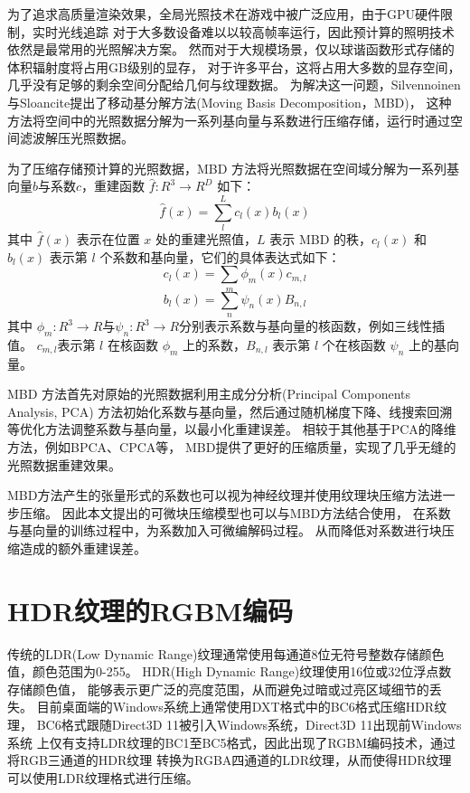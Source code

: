 为了追求高质量渲染效果，全局光照技术在游戏中被广泛应用，由于GPU硬件限制，实时光线追踪
对于大多数设备难以以较高帧率运行，因此预计算的照明技术依然是最常用的光照解决方案。
然而对于大规模场景，仅以球谐函数形式存储的体积辐射度将占用GB级别的显存\cite{silvennoinen2021moving}，
对于许多平台，这将占用大多数的显存空间，几乎没有足够的剩余空间分配给几何与纹理数据。
为解决这一问题，Silvennoinen与Sloancite\cite{silvennoinen2021moving}提出了移动基分解方法(Moving Basis Decomposition，MBD)，
这种方法将空间中的光照数据分解为一系列基向量与系数进行压缩存储，运行时通过空间滤波解压光照数据。

为了压缩存储预计算的光照数据，MBD 方法将光照数据在空间域分解为一系列基向量$b$与系数$c$，重建函数 $\hat{f}:R^3\to R^D$ 如下：
\begin{equation}
\hat f(x)=\sum_{l}^L c_{l} (x)b_{l}(x)
\end{equation}
其中 $\hat{f}(x)$ 表示在位置 $x$ 处的重建光照值，$L$ 表示 MBD 的秩，$c_l(x)$ 和 $b_l(x)$ 表示第 $l$ 个系数和基向量，它们的具体表达式如下：
\begin{equation}
c_{l}(x)=\sum_{m}\phi_{m} (x)c_{m,l}
\end{equation}
\begin{equation}
b_{l}(x)=\sum_{n}\psi_{n} (x)B_{n,l}
\end{equation}
其中 $\phi_{m}: R^{3} \rightarrow R$与$\psi_{n}: R^{3} \rightarrow R$分别表示系数与基向量的核函数，例如三线性插值。 
$c_{m,l}$表示第 $l$ 在核函数 $\phi_m$ 上的系数，$B_{n,l}$ 表示第 $l$ 个在核函数 $\psi_n$ 上的基向量。

MBD\cite{silvennoinen2021moving} 方法首先对原始的光照数据利用主成分分析(Principal Components Analysis, PCA)
方法初始化系数与基向量，然后通过随机梯度下降、线搜索回溯等优化方法调整系数与基向量，以最小化重建误差。
相较于其他基于PCA的降维方法，例如BPCA\cite{nishino2005clustered}、CPCA\cite{sloan2003clustered}等，
MBD提供了更好的压缩质量，实现了几乎无缝的光照数据重建效果。

MBD方法产生的张量形式的系数也可以视为神经纹理并使用纹理块压缩方法进一步压缩。
因此本文提出的可微块压缩模型也可以与MBD方法结合使用，
在系数与基向量的训练过程中，为系数加入可微编解码过程。
从而降低对系数进行块压缩造成的额外重建误差。

\section{HDR纹理的RGBM编码}

传统的LDR(Low Dynamic Range)纹理通常使用每通道8位无符号整数存储颜色值，颜色范围为0-255。
HDR(High Dynamic Range)纹理使用16位或32位浮点数存储颜色值，
能够表示更广泛的亮度范围，从而避免过暗或过亮区域细节的丢失。
目前桌面端的Windows系统上通常使用DXT格式中的BC6格式压缩HDR纹理，
BC6格式跟随Direct3D 11被引入Windows系统，Direct3D 11出现前Windows系统
上仅有支持LDR纹理的BC1至BC5格式，因此出现了RGBM编码技术，通过将RGB三通道的HDR纹理
转换为RGBA四通道的LDR纹理，从而使得HDR纹理可以使用LDR纹理格式进行压缩。

